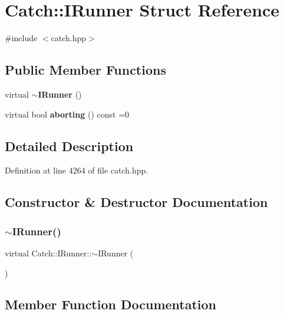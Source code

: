 \section{Catch\+::I\+Runner Struct Reference}
\label{struct_catch_1_1_i_runner}


{\ttfamily \#include $<$catch.\+hpp$>$}

\subsection*{Public Member Functions}
\begin{DoxyCompactItemize}
\item 
virtual \textbf{ $\sim$\+I\+Runner} ()
\item 
virtual bool \textbf{ aborting} () const =0
\end{DoxyCompactItemize}


\subsection{Detailed Description}


Definition at line 4264 of file catch.\+hpp.



\subsection{Constructor \& Destructor Documentation}
\mbox{\label{struct_catch_1_1_i_runner_a5f539a88a7772d68de8a2e4028774209}} 
\subsubsection{$\sim$IRunner()}
{\footnotesize\ttfamily virtual Catch\+::\+I\+Runner\+::$\sim$\+I\+Runner (\begin{DoxyParamCaption}{ }\end{DoxyParamCaption})\hspace{0.3cm}{\ttfamily [virtual]}}



\subsection{Member Function Documentation}
\mbox{\label{struct_catch_1_1_i_runner_a03713202dd2e041e30b8030088ab0116}} 
